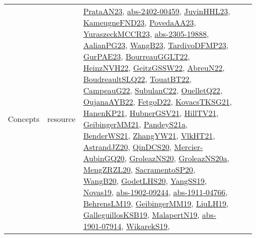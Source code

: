 {\begin{longtable}{lp{3cm}>{\raggedright}p{6cm}>{\raggedright}p{6cm}p{8cm}}
Concepts & resource & \href{articles/PrataAN23.pdf}{PrataAN23}\cite{PrataAN23}, \href{articles/abs-2402-00459.pdf}{abs-2402-00459}\cite{abs-2402-00459}, \href{papers/JuvinHHL23.pdf}{JuvinHHL23}\cite{JuvinHHL23}, \href{papers/KameugneFND23.pdf}{KameugneFND23}\cite{KameugneFND23}, \href{papers/PovedaAA23.pdf}{PovedaAA23}\cite{PovedaAA23}, \href{articles/YuraszeckMCCR23.pdf}{YuraszeckMCCR23}\cite{YuraszeckMCCR23}, \href{articles/abs-2305-19888.pdf}{abs-2305-19888}\cite{abs-2305-19888}, \href{papers/AalianPG23.pdf}{AalianPG23}\cite{AalianPG23}, \href{papers/WangB23.pdf}{WangB23}\cite{WangB23}, \href{papers/TardivoDFMP23.pdf}{TardivoDFMP23}\cite{TardivoDFMP23}, \href{articles/GurPAE23.pdf}{GurPAE23}\cite{GurPAE23}, \href{articles/BourreauGGLT22.pdf}{BourreauGGLT22}\cite{BourreauGGLT22}, \href{articles/HeinzNVH22.pdf}{HeinzNVH22}\cite{HeinzNVH22}, \href{papers/GeitzGSSW22.pdf}{GeitzGSSW22}\cite{GeitzGSSW22}, \href{articles/AbreuN22.pdf}{AbreuN22}\cite{AbreuN22}, \href{papers/BoudreaultSLQ22.pdf}{BoudreaultSLQ22}\cite{BoudreaultSLQ22}, \href{papers/TouatBT22.pdf}{TouatBT22}\cite{TouatBT22}, \href{articles/CampeauG22.pdf}{CampeauG22}\cite{CampeauG22}, \href{articles/SubulanC22.pdf}{SubulanC22}\cite{SubulanC22}, \href{papers/OuelletQ22.pdf}{OuelletQ22}\cite{OuelletQ22}, \href{papers/OujanaAYB22.pdf}{OujanaAYB22}\cite{OujanaAYB22}, \href{articles/FetgoD22.pdf}{FetgoD22}\cite{FetgoD22}, \href{papers/KovacsTKSG21.pdf}{KovacsTKSG21}\cite{KovacsTKSG21}, \href{papers/HanenKP21.pdf}{HanenKP21}\cite{HanenKP21}, \href{articles/HubnerGSV21.pdf}{HubnerGSV21}\cite{HubnerGSV21}, \href{papers/HillTV21.pdf}{HillTV21}\cite{HillTV21}, \href{papers/GeibingerMM21.pdf}{GeibingerMM21}\cite{GeibingerMM21}, \href{articles/PandeyS21a.pdf}{PandeyS21a}\cite{PandeyS21a}, \href{papers/BenderWS21.pdf}{BenderWS21}\cite{BenderWS21}, \href{articles/ZhangYW21.pdf}{ZhangYW21}\cite{ZhangYW21}, \href{articles/VlkHT21.pdf}{VlkHT21}\cite{VlkHT21}, \href{articles/AstrandJZ20.pdf}{AstrandJZ20}\cite{AstrandJZ20}, \href{articles/QinDCS20.pdf}{QinDCS20}\cite{QinDCS20}, \href{papers/Mercier-AubinGQ20.pdf}{Mercier-AubinGQ20}\cite{Mercier-AubinGQ20}, \href{papers/GroleazNS20.pdf}{GroleazNS20}\cite{GroleazNS20}, \href{papers/GroleazNS20a.pdf}{GroleazNS20a}\cite{GroleazNS20a}, \href{articles/MengZRZL20.pdf}{MengZRZL20}\cite{MengZRZL20}, \href{articles/SacramentoSP20.pdf}{SacramentoSP20}\cite{SacramentoSP20}, \href{papers/WangB20.pdf}{WangB20}\cite{WangB20}, \href{papers/GodetLHS20.pdf}{GodetLHS20}\cite{GodetLHS20}, \href{papers/YangSS19.pdf}{YangSS19}\cite{YangSS19}, \href{articles/Novas19.pdf}{Novas19}\cite{Novas19}, \href{articles/abs-1902-09244.pdf}{abs-1902-09244}\cite{abs-1902-09244}, \href{articles/abs-1911-04766.pdf}{abs-1911-04766}\cite{abs-1911-04766}, \href{papers/BehrensLM19.pdf}{BehrensLM19}\cite{BehrensLM19}, \href{papers/GeibingerMM19.pdf}{GeibingerMM19}\cite{GeibingerMM19}, \href{papers/LiuLH19.pdf}{LiuLH19}\cite{LiuLH19}, \href{papers/GalleguillosKSB19.pdf}{GalleguillosKSB19}\cite{GalleguillosKSB19}, \href{papers/MalapertN19.pdf}{MalapertN19}\cite{MalapertN19}, \href{articles/abs-1901-07914.pdf}{abs-1901-07914}\cite{abs-1901-07914}, \href{articles/WikarekS19.pdf}{WikarekS19}\cite{WikarekS19}, 
\end{longtable}}
